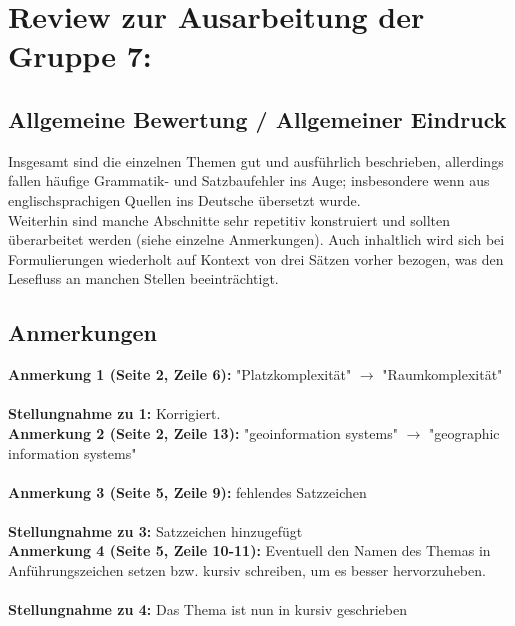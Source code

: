 \documentclass[a4paper,12pt]{book}
\begin{document}
\chapter*{Review zur Ausarbeitung der Gruppe 7:}

\section*{Allgemeine Bewertung / Allgemeiner Eindruck}
Insgesamt sind die einzelnen Themen gut und ausführlich beschrieben, allerdings fallen häufige Grammatik- und Satzbaufehler ins Auge; insbesondere wenn aus englischsprachigen Quellen ins Deutsche übersetzt wurde.\\
Weiterhin sind manche Abschnitte sehr repetitiv konstruiert und sollten überarbeitet werden (siehe einzelne Anmerkungen).
Auch inhaltlich wird sich bei Formulierungen wiederholt auf Kontext von drei Sätzen vorher bezogen, was den Lesefluss an manchen Stellen beeinträchtigt.

\section*{Anmerkungen}

\textbf{Anmerkung 1 (Seite 2, Zeile 6):}
"Platzkomplexität" $\rightarrow$ "Raumkomplexität"\\
\\
\textbf{Stellungnahme zu 1:}
Korrigiert.
\\

\noindent
\textbf{Anmerkung 2 (Seite 2, Zeile 13):}
"geoinformation systems" $\rightarrow$ "geographic information systems"\\
\\

\noindent
\textbf{Anmerkung 3 (Seite 5, Zeile 9):}
fehlendes Satzzeichen
\\ \\
\textbf{Stellungnahme zu 3:}
Satzzeichen hinzugefügt
\\

\noindent
\textbf{Anmerkung 4 (Seite 5, Zeile 10-11):}
Eventuell den Namen des Themas in Anführungszeichen setzen bzw. kursiv schreiben, um es besser hervorzuheben.\\
\\
\textbf{Stellungnahme zu 4:}
Das Thema ist nun in kursiv geschrieben
\\
\end{document}
